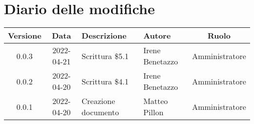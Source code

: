 \section*{Diario delle modifiche}
	\begin{center}
	\renewcommand{\arraystretch}{1.8} %
	\begin{tabular}{ |c|c|m{12em}|m{7em}|c| }
	\hline
	\textbf{Versione} & \textbf{Data} & \textbf{Descrizione} &  \textbf{Autore} &  \textbf{Ruolo} \\ %
	\hline
	0.0.3 & 2022-04-21 & Scrittura \$5.1 & Irene Benetazzo & Amministratore\\
	\hline
	0.0.2 & 2022-04-20 & Scrittura \$4.1 & Irene Benetazzo & Amministratore\\
	\hline
    0.0.1 & 2022-04-20 & Creazione documento & Matteo Pillon & Amministratore\\ %
	\hline
	\end{tabular}
	\end{center}
	\newpage